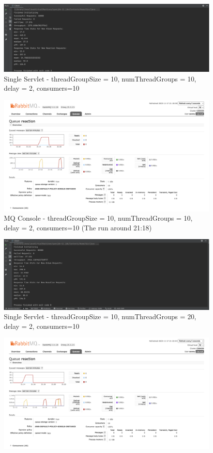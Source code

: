 \documentclass[a4paper,12pt]{article} %
\begin{document}
\begin{enumerate}
\begin{figure}[H]
    \centering
    \includegraphics[width=\textwidth]{images/stats_10.png}
    \caption{Single Servlet - threadGroupSize = 10, numThreadGroups = 10, delay = 2, consumers=10}
\end{figure}
\begin{figure}[H]
    \centering
    \includegraphics[width=\textwidth]{images/mq_console_10.png}
    \caption{MQ Console - threadGroupSize = 10, numThreadGroups = 10, delay = 2, consumers=10 (The run around 21:18)}
\end{figure}
\begin{figure}[H]
    \centering
    \includegraphics[width=\textwidth]{images/stats_20.png}
    \caption{Single Servlet - threadGroupSize = 10, numThreadGroups = 20, delay = 2, consumers=10}
\end{figure}
\begin{figure}[H]
    \centering
    \includegraphics[width=\textwidth]{images/mq_console_20.png}

\end{figure}
\end{enumerate}
\end{document}
